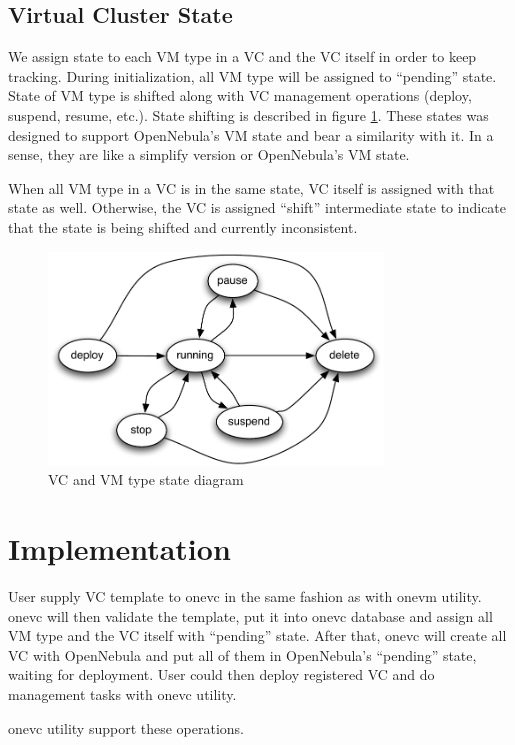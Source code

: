 \documentclass[conference]{IEEEtran}
\begin{document}
\subsection{Virtual Cluster State}
We assign state to each VM type in a VC and the VC itself in order to keep tracking.
During initialization, all VM type will be assigned to ``pending'' state.
State of VM type is shifted along with VC management operations (deploy, suspend, resume, etc.).
State shifting is described in figure \ref{fig:state}.
These states was designed to support OpenNebula's VM state\cite{opennebula-state} and bear a similarity with it.
In a sense, they are like a simplify version or OpenNebula's VM state.

When all VM type in a VC is in the same state, VC itself is assigned with that state as well.
Otherwise, the VC is assigned ``shift'' intermediate state to indicate that the state is being shifted and currently inconsistent.

\begin{figure}[!t]
\centering
\includegraphics[width=3.5in]{state}
\caption{VC and VM type state diagram}
\label{fig:state}
\end{figure}

\section{Implementation}
User supply VC template to onevc in the same fashion as with onevm utility.
onevc will then validate the template, put it into onevc database and assign all VM type and the VC itself with ``pending'' state.
After that, onevc will create all VC with OpenNebula and put all of them in OpenNebula's ``pending'' state, waiting for deployment.
User could then deploy registered VC and do management tasks with onevc utility.

onevc utility support these operations.
\end{document}
